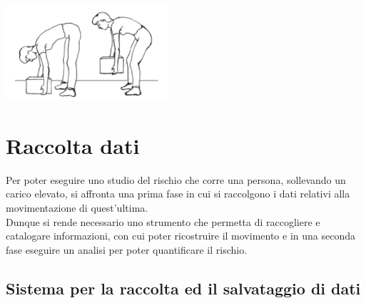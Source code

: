 \documentclass[a4paper]{article}
\begin{document}
\makebox[\linewidth]{}
\begin{center}
\begin{minipage}{0.48\linewidth}
\includegraphics[width=60mm,scale=0.7]{./images/sollevamento_scorretto.png} 
\makebox[\linewidth]{}
\end{minipage}
\end{center}




	\clearpage

	\section{Raccolta dati}
Per poter eseguire uno studio del rischio che corre una persona, sollevando un carico elevato, si affronta una prima fase in cui si raccolgono i dati relativi alla movimentazione di quest'ultima. \\
Dunque si rende necessario uno strumento che permetta di raccogliere e catalogare informazioni, con cui poter ricostruire il movimento e in una seconda fase eseguire un analisi per poter quantificare il rischio. \\



	\subsection{Sistema per la raccolta ed il salvataggio di dati}
\end{document}
